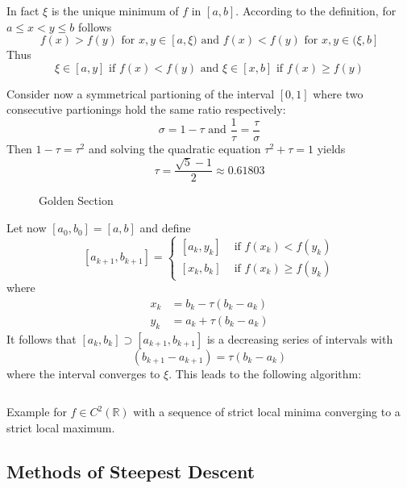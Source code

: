 In fact \( \xi \) is the unique minimum of \( f \) in \( [a, b] \). According to the definition,
for \( a \le x < y \le b \) follows
\[
    f(x) > f(y) \text{ for } x, y \in [a, \xi) \text{ and } f(x) < f(y) \text{ for }  x, y \in (\xi, b]   %
\]
Thus
\[
    \xi \in [a, y] \text{ if } f(x) < f(y) \text{ and } \xi \in [x, b] \text{ if } f(x) \ge f(y)
\]

Consider now a symmetrical partioning of the interval \( [0, 1] \) where two consecutive partionings hold
the same ratio respectively:
\[
    \sigma = 1 - \tau \text{ and } \frac{1}{\tau} = \frac{\tau}{\sigma}
\]
Then \( 1 - \tau = \tau^2 \) and solving the quadratic equation \( \tau^2 + \tau = 1 \) yields
\[
    \tau = \frac{\sqrt{5} - 1}{2} \approx 0.61803
\]
\bigskip

\begin{figure}[H]
    \centering
    \plotgoldensection{}
    \caption{Golden Section}\label{fig:golden_section}
\end{figure}
\bigskip

Let now \( [a_0, b_0] = [a, b] \) and define
\[
    [a_{k + 1}, b_{k + 1}] =
    \begin{cases}
        [a_k, y_k] & \text{ if } f(x_k) < f(y_k)   \\
        [x_k, b_k] & \text{ if } f(x_k) \ge f(y_k)
    \end{cases}
\]
where
\[
    \begin{split}
        x_k & = b_k - \tau (b_k - a_k) \\
        y_k & = a_k + \tau (b_k - a_k)
    \end{split}
\]
It follows that \( [a_k, b_k] \supset [a_{k + 1}, b_{k + 1}] \) is a decreasing series of intervals with
\[
    (b_{k + 1} - a_{k + 1}) =  \tau(b_k - a_k)
\]
where the interval converges to \( \xi \). This leads to the following algorithm:
\bigskip

\begin{algorithm}\label{algo:golden_section_search}
\end{algorithm}
\inputminted[fontsize=\small, framesep=0.35cm, frame=lines, python3=true]{python}{../jupyter/golden_section.py}
\bigskip

\begin{exercise}
    Example for \( f \in C^2(\mathbb{R}) \) with a sequence of strict local minima converging to a strict local maximum.
\end{exercise}
\bigskip


\subsection{Methods of Steepest Descent}
\bigskip


